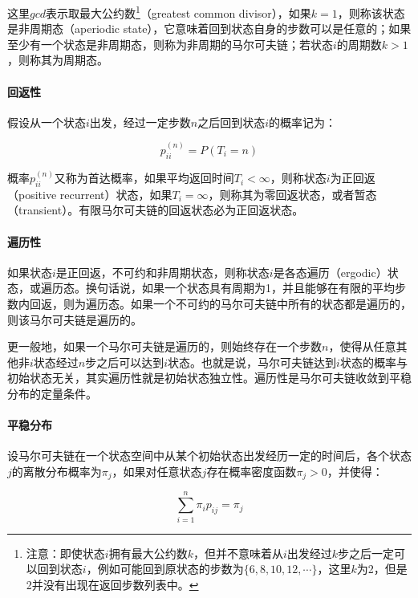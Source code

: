 这里$gcd$表示取最大公约数\footnote{注意：即使状态$i$拥有最大公约数$k$，但并不意味着从$i$出发经过$k$步之后一定可以回到状态$i$，例如可能回到原状态的步数为$\{6,8,10,12,\cdots\}$，这里$k$为2，但是2并没有出现在返回步数列表中。}（greatest common divisor），如果$k=1$，则称该状态是非周期态（aperiodic state），它意味着回到状态自身的步数可以是任意的；如果至少有一个状态是非周期态，则称为非周期的马尔可夫链；若状态$i$的周期数$k>1$，则称其为周期态。



\paragraph{回返性}
假设从一个状态$i$出发，经过一定步数$n$之后回到状态$i$的概率记为：

\begin{equation}
	p^{(n)}_{ii}=P(T_i=n)
\end{equation}

\noindent 概率$p^{(n)}_{ii}$又称为首达概率，如果平均返回时间$T_i<\infty$，则称状态$i$为正回返（positive recurrent）状态，如果$T_i=\infty$，则称其为零回返状态，或者暂态（transient）。有限马尔可夫链的回返状态必为正回返状态。




\paragraph{遍历性}
如果状态$i$是正回返，不可约和非周期状态，则称状态$i$是各态遍历（ergodic）状态，或遍历态。换句话说，如果一个状态具有周期为1，并且能够在有限的平均步数内回返，则为遍历态。如果一个不可约的马尔可夫链中所有的状态都是遍历的，则该马尔可夫链是遍历的。

更一般地，如果一个马尔可夫链是遍历的，则始终存在一个步数$n$，使得从任意其他非$i$状态经过$n$步之后可以达到$i$状态。也就是说，马尔可夫链达到$i$状态的概率与初始状态无关，其实遍历性就是初始状态独立性。遍历性是马尔可夫链收敛到平稳分布的定量条件。




\paragraph{平稳分布}
设马尔可夫链在一个状态空间中从某个初始状态出发经历一定的时间后，各个状态$j$的离散分布概率为$\pi_{j}$，如果对任意状态$j$存在概率密度函数$\pi_j>0$，并使得：

\begin{equation}
	\sum^{n}_{i=1}\pi_i p_{ij}=\pi_j
\end{equation}

